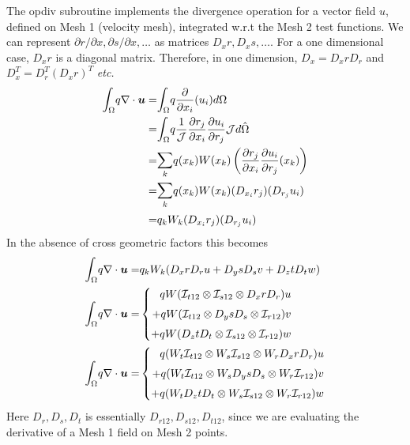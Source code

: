 \documentclass{kthreport}
\begin{document}
The opdiv subroutine implements the divergence operation for a vector field $u$, defined on Mesh 1 (velocity mesh), integrated w.r.t the Mesh 2 test functions. We can represent $\partial r/\partial x, \partial s/\partial x, \ldots$ as matrices $D_{x}r, D_{x}s, \ldots$. For a one dimensional case, $D_{x}r$ is a diagonal matrix. Therefore, in one dimension, $D_{x} = D_{x}rD_{r}$ and $D^{T}_{x} = D^{T}_{r}(D_{x}r)^{T}$ \textit{etc.} 
\begin{eqnarray}
	 \mathlarger\int_{\Omega} q\nabla\cdot \bm{u}  = & \mathlarger\int_{\Omega} q\dfrac{\partial }{\partial x_{i}}(u_{i}) d\Omega \nonumber \\
	 = & \mathlarger\int_{\Omega} q\dfrac{1}{\mathcal{J}}\dfrac{\partial r_{j}}{\partial x_{i}}\dfrac{\partial u_{i}}{\partial r_{j}} \mathcal{J} d\hat{\Omega} \nonumber \\
	 =& \mathlarger\sum_{k} q(x_{k})W(x_{k})\left(\dfrac{\partial r_{j}}{\partial x_{i}}\dfrac{\partial u_{i}}{\partial r_{j}}(x_{k})\right)  \nonumber \\
	 =& \mathlarger\sum_{k} q(x_{k})W(x_{k})(D_{x_{i}}r_{j})(D_{r_{j}}u_{i})  \nonumber \\
	 =&  q_{k}W_{k}(D_{x_{i}}r_{j})(D_{r_{j}}u_{i})  \nonumber
\end{eqnarray}
In the absence of cross geometric factors this becomes
\begin{eqnarray}
	 \mathlarger\int_{\Omega} q\nabla\cdot \bm{u}  = &  q_{k}W_{k}(D_{x}rD_{r}u + D_{y}sD_{s}v + D_{z}tD_{t}w)  \nonumber \\
	 \mathlarger\int_{\Omega} q\nabla\cdot \bm{u}  = & \left\{
	 \begin{split}
	    qW(\mathcal{I}_{t12}\otimes\mathcal{I}_{s12}\otimes D_{x}rD_{r})u \\ 
	    + qW(\mathcal{I}_{t12}\otimes D_{y}sD_{s}\otimes\mathcal{I}_{r12})v \\ 
	    + qW(D_{z}tD_{t}\otimes\mathcal{I}_{s12}\otimes \mathcal{I}_{r12})w
 	 \end{split}\right.  \\
%
	 \mathlarger\int_{\Omega} q\nabla\cdot \bm{u}  = & \left\{
	 \begin{split}
	q(W_{t}\mathcal{I}_{t12}\otimes W_{s}\mathcal{I}_{s12}\otimes W_{r}D_{x}rD_{r})u \\ 
	+ q(W_{t}\mathcal{I}_{t12}\otimes W_{s}D_{y}sD_{s}\otimes W_{r}\mathcal{I}_{r12})v \\ 
	+ q(W_{t}D_{z}tD_{t}\otimes W_{s}\mathcal{I}_{s12}\otimes W_{r}\mathcal{I}_{r12})w
\end{split}\right.  
\end{eqnarray}
Here $D_{r},D_{s},D_{t}$ is essentially $D_{r12},D_{s12},D_{t12}$, since we are evaluating the derivative of a Mesh 1 field on Mesh 2 points.
\end{document}
